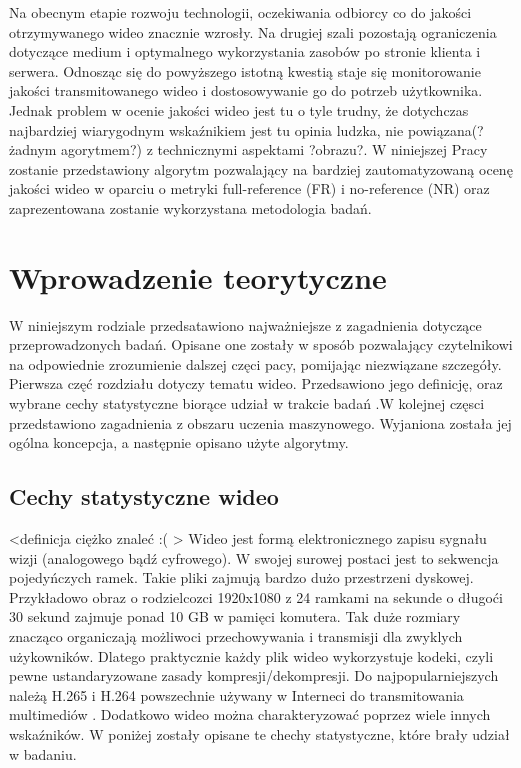 Na obecnym etapie rozwoju technologii, oczekiwania odbiorcy co do jakości otrzymywanego wideo znacznie wzrosły. Na drugiej szali pozostają ograniczenia dotyczące medium i optymalnego wykorzystania zasobów po stronie klienta i serwera. Odnosząc się do powyższego istotną kwestią staje się monitorowanie jakości transmitowanego wideo i dostosowywanie go do potrzeb użytkownika. Jednak problem w ocenie jakości wideo jest tu o tyle trudny, że dotychczas najbardziej wiarygodnym wskaźnikiem jest tu opinia ludzka, nie powiązana(?żadnym agorytmem?) z technicznymi aspektami ?obrazu?. W niniejszej Pracy zostanie przedstawiony algorytm pozwalający na bardziej zautomatyzowaną ocenę jakości wideo w oparciu o metryki full-reference (FR) i no-reference (NR) oraz zaprezentowana zostanie wykorzystana metodologia badań.



\chapter{Wprowadzenie teorytyczne}
\label{cha:pierwszyDokument}

W niniejszym rodziale przedsatawiono najważniejsze z zagadnienia dotyczące przeprowadzonych badań. Opisane one zostały w sposób pozwalający czytelnikowi na odpowiednie zrozumienie dalszej częci pacy, pomijając niezwiązane szczegóły. Pierwsza częć rozdziału dotyczy tematu wideo. Przedsawiono jego definicję, oraz wybrane cechy statystyczne  biorące udział w trakcie badań .W kolejnej częsci przedstawiono zagadnienia z obszaru uczenia maszynowego. Wyjaniona została jej ogólna koncepcja, a następnie opisano użyte algorytmy.


\section{Cechy statystyczne wideo}

<definicja ciężko znaleć :( >
Wideo jest formą elektronicznego zapisu sygnału wizji (analogowego bądź cyfrowego). W swojej surowej postaci jest to sekwencja pojedyńczych ramek. Takie pliki  zajmują bardzo dużo przestrzeni dyskowej. Przykładowo obraz o rodzielcozci 1920x1080 z 24 ramkami na sekunde o długoći 30 sekund zajmuje ponad 10 GB w pamięci komutera. Tak duże rozmiary znacząco organiczają możliwoci przechowywania i transmisji dla zwyklych użykowników. Dlatego praktycznie każdy plik wideo wykorzystuje kodeki, czyli pewne ustandaryzowane zasady kompresji/dekompresji. Do najpopularniejszych należą H.265 i  H.264 powszechnie używany w Interneci do transmitowania multimediów \cite{video_codecs}. Dodatkowo wideo można charakteryzować poprzez wiele innych wskaźników. W poniżej zostały opisane te chechy statystyczne,  które brały udział w  badaniu.

